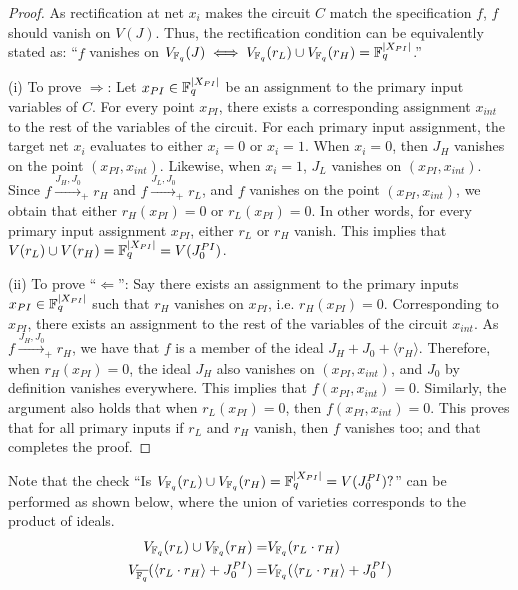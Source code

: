 \begin{proof}
As rectification at net $x_i$ makes the circuit $C$ match the
specification $f$, $f$ should vanish on $V(J)$. Thus, the
rectification condition can be equivalently stated as:
``$f$ vanishes on $V_{{\mathbb{F}}_{q}}(J) \iff V_{{\mathbb{F}}_{q}}(r_L) \cup V_{{\mathbb{F}}_{q}}(r_H) =
  {\mathbb{F}}_{q}^{|X_{PI}|}$.''

(i) To prove $\Rightarrow$: Let $x_{PI} \in {\mathbb{F}}_{q}^{|X_{PI}|}$ be an
assignment to the primary input variables of $C$. For every point
$x_{PI}$, there exists a corresponding assignment $x_{int}$ to the
rest of the variables of the circuit. For each primary input assignment,
the target net $x_i$ evaluates to either $x_i = 0$ or $x_i = 1$. When
$x_i = 0$, then $J_H$ vanishes on the point $(x_{PI},
x_{int})$. Likewise, when $x_i = 1$, $J_L$ vanishes on $(x_{PI},
x_{int})$. Since $f\xrightarrow{J_H,J_0}_+r_H$ and
$f\xrightarrow{J_L,J_0}_+r_L$, and $f$ vanishes on the point
$(x_{PI},x_{int})$, we obtain that either $r_H(x_{PI}) = 0$ or
$r_L(x_{PI}) = 0$. In other words, for every 
primary input assignment $x_{PI}$, either $r_L$ or $r_H$ vanish. This
implies that $V(r_L) \cup V(r_H) = {\mathbb{F}}_{q}^{|X_{PI}|} = V(J_0^{PI})$.

(ii) To prove ``$\Leftarrow$'': Say there exists an assignment to the
primary inputs $x_{PI} \in {\mathbb{F}}_{q}^{|X_{PI}|}$ such that $r_H$ vanishes on
$x_{PI}$, i.e. $r_H(x_{PI})=0$. Corresponding to $x_{PI}$, there exists
an assignment to the rest of the variables of the circuit $x_{int}$. 
As $f\xrightarrow{J_H, J_0}_+ r_H$, we have that $f$ is a member of the
ideal $J_H + J_0 + \langle r_H \rangle$. Therefore, when
$r_H(x_{PI})=0$, the ideal $J_H$ also vanishes on $(x_{PI},x_{int})$,
and $J_0$ by definition vanishes everywhere. This implies that
$f(x_{PI},x_{int})=0$. Similarly, the argument also holds that when
$r_L(x_{PI})=0$, then $f(x_{PI},x_{int})=0$. This proves that for all
primary inputs if $r_L$ and $r_H$ vanish, then $f$ vanishes too; and
that completes the proof.


  
\end{proof}

Note that the check ``Is $V_{{\mathbb{F}}_{q}}(r_L) \cup V_{{\mathbb{F}}_{q}}(r_H) =
{\mathbb{F}}_{q}^{|X_{PI}|} = V(J_0^{PI})?$'' can be performed as shown below,
where the union of varieties corresponds to the product of ideals.
\begin{align}
 V_{{\mathbb{F}}_{q}}(r_L) \cup V_{{\mathbb{F}}_{q}}(r_H)  =&V_{{\mathbb{F}}_{q}}(r_L\cdot r_H)\\
  V_{{\overline{{\mathbb{F}}_q}}}(\langle r_L\cdot r_H \rangle+ J_0^{PI}) =&V_{{\mathbb{F}}_{q}}(\langle r_L\cdot r_H \rangle+ J_0^{PI})
\end{align}

